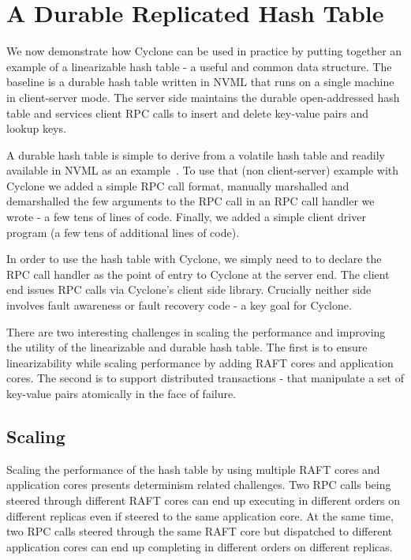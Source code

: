 \documentclass[letterpaper,twocolumn,10pt]{article}
\begin{document}
\section{A Durable Replicated Hash Table}
\label{sec:example}
We now demonstrate how Cyclone can be used in practice by putting together an
example of a linearizable hash table - a useful and common data structure.
The baseline is a durable hash table written in NVML that runs on a
single machine in client-server mode. The server side maintains the durable
open-addressed hash table and services client RPC calls to insert and delete
key-value pairs and lookup keys.

A durable hash table is simple to derive from a volatile hash table and readily
available in NVML as an example~\cite{nvml_hash}. To use that (non client-server)
example with Cyclone we added a simple RPC call format, manually marshalled and
demarshalled the few arguments to the RPC call in an RPC call handler we wrote -
a few tens of lines of code. Finally, we added a simple client driver program (a
few tens of additional lines of code).

In order to use the hash table with Cyclone, we simply need to to declare the
RPC call handler as the point of entry to Cyclone at the server end.  The client
end issues RPC calls via Cyclone's client side library. Crucially neither side
involves fault awareness or fault recovery code - a key goal for Cyclone.

There are two interesting challenges in scaling the performance and improving
the utility of the linearizable and durable hash table. The first is to ensure
linearizability while scaling performance by adding RAFT cores and application
cores. The second is to support distributed transactions - that manipulate a set
of key-value pairs atomically in the face of failure.

\subsection{Scaling}
Scaling the performance of the hash table by using multiple RAFT cores and
application cores presents determinism related challenges. Two RPC calls being
steered through different RAFT cores can end up executing in different orders on
different replicas even if steered to the same application core. At the same time,
two RPC calls steered through the same RAFT core but dispatched to different
application cores can end up completing in different orders on different replicas.
\end{document}
